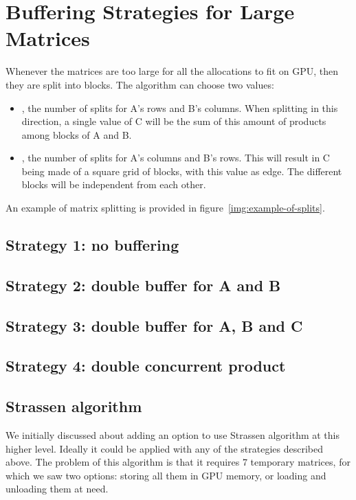 \section{Buffering Strategies for Large Matrices}
\label{sec:strategies}


Whenever the matrices are too large for all the allocations to fit on GPU, then they are split into blocks.
The algorithm can choose two values:
\begin{itemize}
	\item {}, the number of splits for A's rows and B's columns. When splitting in this direction, a single value of C will be the sum of this amount of products among blocks of A and B.
	\item{}, the number of splits for A's columns and B's rows. This will result in C being made of a square grid of blocks, with this value as edge. The different blocks will be independent from each other.
\end{itemize}

An example of matrix splitting is provided in figure~\ref{img:example-of-splits}.


\subsection{Strategy 1: no buffering}



\subsection{Strategy 2: double buffer for A and B}
\subsection{Strategy 3: double buffer for A, B and C}
\subsection{Strategy 4: double concurrent product}


\subsection{Strassen algorithm}

We initially discussed about adding an option to use Strassen algorithm at this higher level.
Ideally it could be applied with any of the strategies described above.
The problem of this algorithm is that it requires 7 temporary matrices, for which we saw two options: storing all them in GPU memory, or loading and unloading them at need.

